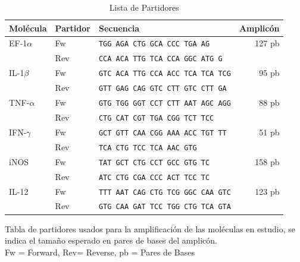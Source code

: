 \documentclass[12pt,letterpaper,oneside]{scrbook}
\begin{document}
\begin{table}[h!]
    \begin{center}
        \begin{threeparttable}
            \caption{Lista de Partidores}\label{tabla:partidores}
            \begin{tabularx}{15cm}{l l X r}
                \toprule
                \textbf{Molécula}   & \textbf{Partidor} & \textbf{Secuencia} & \textbf{Amplicón} \\
                \midrule
                EF-1$\alpha$        & Fw    & \texttt{TGG AGA CTG GCA CCC TGA AG}       & 127 pb    \\
                                    & Rev   & \texttt{CCA ACA TTG TCA CCA GGC ATG G}    &           \\
                IL-1$\beta$         & Fw    & \texttt{GTC ACA TTG CCA ACC TCA TCA TCG}  & 95 pb     \\
                                    & Rev   & \texttt{GTT GAG CAG GTC CTT GTC CTT GA}   &           \\
                TNF-$\alpha$        & Fw    & \texttt{GTG TGG GGT CCT CTT AAT AGC AGG}  & 88 pb     \\
                                    & Rev   & \texttt{CTG CAT CGT TGA CGG TCT TCC}      &           \\
                IFN-$\gamma$        & Fw    & \texttt{GCT GTT CAA CGG AAA ACC TGT TT}   & 51 pb     \\
                                    & Rev   & \texttt{TCA CTG TCC TCA AAC GTG}          &           \\
                iNOS                & Fw    & \texttt{TAT GCT CTG CCT GCC GTG TC}       & 158 pb    \\
                                    & Rev   & \texttt{ATC CTG CGA CCC ACT TCC TC}       &           \\
                IL-12               & Fw    & \texttt{TTT AAT CAG CTG TCG GGC CAA GTC}  & 123 pb    \\
                                    & Rev   & \texttt{GTG CAA GAT TCC TGG CTG TCA GTA}  &           \\
                \bottomrule                         
            \end{tabularx}
            \begin{tablenotes}
                \item Tabla de partidores usados para la amplificación de las moléculas en estudio, se indica el tamaño esperado en pares de bases del amplicón. \\ Fw = Forward, Rev= Reverse, pb = Pares de Bases
            \end{tablenotes}
        \end{threeparttable}
    \end{center}
\end{table}
\end{document}

